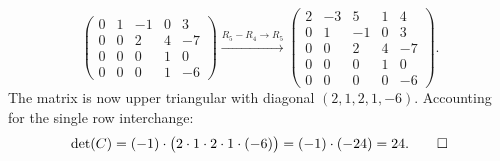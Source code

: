 \begin{exercisesolution*}
\begin{enumerate}[label=\textbf{(\alph*)}]
\[\begin{pmatrix}
      0 & 1 & -1 & 0 & 3 \\
      0 & 0 & 2 & 4 & -7 \\
      0 & 0 & 0 & 1 & 0 \\
      0 & 0 & 0 & 1 & -6
    \end{pmatrix}
    \xrightarrow{R_5 - R_4 \to R_5}
    \begin{pmatrix}
      2 & -3 & 5 & 1 & 4 \\
      0 & 1 & -1 & 0 & 3 \\
      0 & 0 & 2 & 4 & -7 \\
      0 & 0 & 0 & 1 & 0 \\
      0 & 0 & 0 & 0 & -6
    \end{pmatrix}.
    \]
    The matrix is now upper triangular with diagonal $(2, 1, 2, 1, -6)$.
    Accounting for the single row interchange:
    \[
    \det(C) = (-1) \cdot \big(2 \cdot 1 \cdot 2 \cdot 1 \cdot (-6)\big) = (-1) \cdot (-24) = 24. \qedhere
    \]
\end{enumerate}
\end{exercisesolution*}

